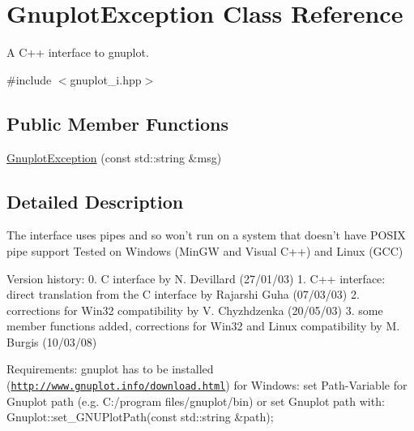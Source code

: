 \hypertarget{classGnuplotException}{\section{\-Gnuplot\-Exception \-Class \-Reference}
\label{classGnuplotException}
}


\-A \-C++ interface to gnuplot.  




{\ttfamily \#include $<$gnuplot\-\_\-i.\-hpp$>$}

\subsection*{\-Public \-Member \-Functions}
\begin{DoxyCompactItemize}
\item 
\hyperlink{classGnuplotException_a8b324a9ef4d3f75079d41ecd61c62d44}{\-Gnuplot\-Exception} (const std\-::string \&msg)
\end{DoxyCompactItemize}


\subsection{\-Detailed \-Description}
\-The interface uses pipes and so won't run on a system that doesn't have \-P\-O\-S\-I\-X pipe support \-Tested on \-Windows (\-Min\-G\-W and \-Visual \-C++) and \-Linux (\-G\-C\-C)

\-Version history\-: 0. \-C interface by \-N. \-Devillard (27/01/03) 1. \-C++ interface\-: direct translation from the \-C interface by \-Rajarshi \-Guha (07/03/03) 2. corrections for \-Win32 compatibility by \-V. \-Chyzhdzenka (20/05/03) 3. some member functions added, corrections for \-Win32 and \-Linux compatibility by \-M. \-Burgis (10/03/08)

\-Requirements\-: gnuplot has to be installed (\href{http://www.gnuplot.info/download.html}{\tt http\-://www.\-gnuplot.\-info/download.\-html}) for \-Windows\-: set \-Path-\/\-Variable for \-Gnuplot path (e.\-g. \-C\-:/program files/gnuplot/bin) or set \-Gnuplot path with\-: \-Gnuplot\-::set\-\_\-\-G\-N\-U\-Plot\-Path(const std\-::string \&path); 

